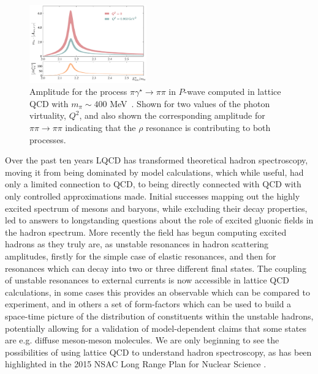 \begin{figure}
\includegraphics[width=0.45\textwidth]{figures/rho_pi_gamma}
\caption{Amplitude for the process ${\pi \gamma^\star \to \pi\pi}$ in $P$-wave computed in lattice QCD with $m_\pi \sim 400$ MeV~\cite{Briceno:2016kkp,Briceno:2015dca}. Shown for two values of the photon virtuality, $Q^2$, and also shown the corresponding amplitude for $\pi\pi \to \pi \pi$ indicating that the $\rho$ resonance is contributing to both processes.  }
\label{rhopigamma}
\end{figure}

\vspace{5mm}
Over the past ten years LQCD has transformed theoretical hadron spectroscopy, moving it from being dominated by model calculations, which while useful, had only a limited connection to QCD, to being directly connected with QCD with only controlled approximations made. Initial successes mapping out the highly excited spectrum of mesons and baryons, while excluding their decay properties, led to answers to longstanding questions about the role of excited gluonic fields in the hadron spectrum. More recently the field has begun computing excited hadrons as they truly are, as unstable resonances in hadron scattering amplitudes, firstly for the simple case of elastic resonances, and then for resonances which can decay into two or three different final states. The coupling of unstable resonances to external currents is now accessible in lattice QCD calculations, in some cases this provides an observable which can be compared to experiment, and in others a set of form-factors which can be used to build a space-time picture of the distribution of constituents within the unstable hadrons, potentially allowing for a validation of model-dependent claims that some states are e.g. diffuse meson-meson molecules. We are only beginning to see the possibilities of using lattice QCD to understand hadron spectroscopy, as has been highlighted in the 2015 NSAC Long Range Plan for Nuclear Science \cite{Geesaman:2015fha}.

